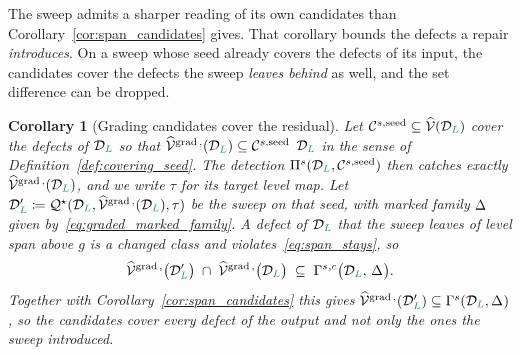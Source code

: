 \documentclass[a4paper, 12pt]{article}
\makeatletter
\newcommand{\robert}[1]{{\color{orange} #1}}
\newcommand{\quadriV}{\mathcal{Q}^{\star}}                       %
\newcommand{\detectG}{\Pi^{s}}                                   %
\newcommand{\collectC}{\Gamma^{s}}                               %
\DeclareRobustCommand{\gradeClasses}[1][]{\widehat{\V}^{\mathrm{grad} \, \ifx\@empty#1\@empty\else,#1\fi}}
\DeclareRobustCommand{\candC}[1][]{\mathcal{C}^{s\ifx\@empty#1\@empty\else,#1\fi}}
\newcommand{\quadriVup}[1]{\quadriV_{\rightarrow #1}}            %
\newcommand{\targetlevel}{\tau}                                 %
\newcommand{\green}{\color{ForestGreen}}
\newcommand{\V}{\mathcal{V}}
\DeclareRobustCommand{\simplexsubsetTwo}[2][]{\Delta\ifx\@empty#1\@empty\else^{#1}\fi_{#2}}
\newcommand{\vertexClasses}{\widehat{\V}}
\renewcommand{\L}{{\green L}}
\newtheorem{corollary}[theorem]{Corollary}
\theoremstyle{definition}
\theoremstyle{plain}
\numberwithin{equation}{section}
\newcommand{\tobecut}[1]{{\color{red} #1}}     %
\DeclareRobustCommand{\domseq}[1][]{\mathcal{D}\ifx\@empty#1\@empty\else_{#1}\fi}
\makeatother
\begin{document}
The sweep admits a sharper reading of its own candidates than Corollary~\ref{cor:span_candidates} gives. That corollary bounds the defects a repair \emph{introduces}. On a sweep whose seed already covers the defects of its input, the candidates cover the defects the sweep \emph{leaves behind} as well, and the set difference can be dropped.

\begin{corollary}[Grading candidates cover the residual]
    \label{cor:grading_candidates_cover}
    Let $\candC[\mathrm{seed}] \subseteq \vertexClasses(\domseq[\L])$ cover \tobecut{the defects of $\domseq[\L]$ so that $\gradeClasses(\domseq[\L]) \subseteq \candC[\mathrm{seed}]$}\robert{$\domseq[\L]$ in the sense of Definition~\ref{def:covering_seed}}. The detection $\detectG(\domseq[\L], \candC[\mathrm{seed}])$ then catches exactly $\gradeClasses(\domseq[\L])$, and we write $\targetlevel$ for its target level map. Let $\domseq[\L]' \coloneq \quadriV(\domseq[\L], \gradeClasses(\domseq[\L]), \targetlevel)$ be the sweep on that seed, with marked family $\simplexsubsetTwo{}$ given by~\eqref{eq:graded_marked_family}. A defect of $\domseq[\L]$ that the sweep leaves of level span above $g$ is a changed class and violates~\eqref{eq:span_stays}, so
    \begin{equation}
        \label{eq:grading_candidates_cover}
        \gradeClasses \big( \domseq[\L]' \big) \; \cap \; \gradeClasses \big( \domseq[\L] \big) \; \subseteq \; \collectC{}^{,c} \big( \domseq[\L], \, \simplexsubsetTwo{} \big) .
    \end{equation}
    Together with Corollary~\ref{cor:span_candidates} this gives $\gradeClasses ( \domseq[\L]' ) \subseteq \collectC ( \domseq[\L], \simplexsubsetTwo{} )$, so the candidates cover every defect of the output and not only the ones the sweep introduced.
\end{corollary}
\end{document}
